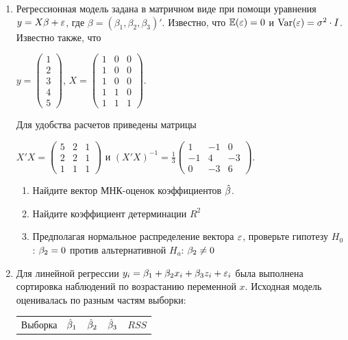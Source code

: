 \documentclass[12pt, a4paper]{article}
\begin{document}
\begin{enumerate}
\item Регрессионная модель  задана в матричном виде при помощи уравнения $y=X\beta+\varepsilon$, где $\beta=(\beta_1,\beta_2,\beta_3)'$.
Известно, что $\mathbb{E}(\varepsilon)=0$  и  $\operatorname{Var}(\varepsilon)=\sigma^2\cdot I$.
Известно также, что

$y=\left(
\begin{array}{c}
1\\
2\\
3\\
4\\
5
\end{array}\right)$,
$X=\left(\begin{array}{ccc}
1 & 0 & 0 \\
1 & 0 & 0 \\
1 & 0 & 0 \\
1 & 1 & 0 \\
1 & 1 & 1
\end{array}\right)$.


Для удобства расчетов приведены матрицы


$X'X=\left(
\begin{array}{ccc}
5 & 2 & 1\\
2 & 2 & 1\\
1 & 1 & 1
\end{array}\right)$ и $(X'X)^{-1}=\frac{1}{3}\left(
\begin{array}{ccc}
1 & -1 & 0 \\
-1 & 4 & -3 \\
0 & -3 & 6
\end{array}\right)$.

\begin{enumerate}
\item Найдите вектор МНК-оценок коэффициентов $\hat{\beta}$.
\item Найдите коэффициент детерминации $R^2$
\item Предполагая нормальное распределение вектора $\varepsilon$, проверьте гипотезу $H_0$: $\beta_2=0$ против альтернативной $H_a$: $\beta_2\neq 0$
\end{enumerate}

\item Для линейной регрессии $y_i = \beta_1 + \beta_2 x_i + \beta_3 z_i + \varepsilon_i$ была выполнена сортировка наблюдений по возрастанию переменной $x$. Исходная модель оценивалась по разным частям выборки:

\begin{tabular}{c|cccc}
Выборка & $\hat{\beta}_1$ & $\hat{\beta}_2$ & $\hat{\beta}_3$ & $RSS$ \\


\end{tabular}
\end{enumerate}
\end{document}
